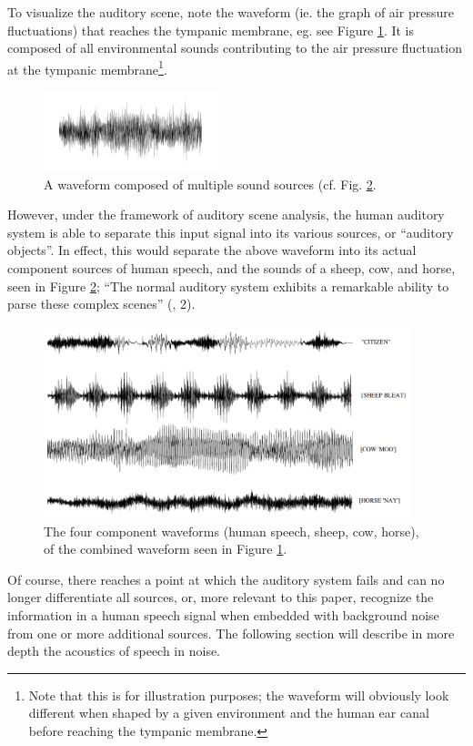 \documentclass[dissertation,copyright]{uathesis}
\begin{document}
To visualize the auditory scene, note the waveform (ie. the graph of air pressure fluctuations) that reaches the tympanic membrane, eg. see Figure \ref{fig:animal_singlechannel}.  It is composed of all environmental sounds contributing to the air pressure fluctuation at the tympanic membrane\footnote{Note that this is for illustration purposes; the waveform will obviously look different when shaped by a given environment and the human ear canal before reaching the tympanic membrane.}.
%
\begin{figure}
\centering
  \includegraphics[width=0.45\textwidth]{figure/single-channel-animals.png}
  \caption{A waveform composed of multiple sound sources (cf. Fig. \ref{fig:animal_multichannel}.}
  \label{fig:animal_singlechannel}
\end{figure}

However, under the framework of auditory scene analysis, the human auditory system is able to separate this input signal into its various sources, or ``auditory objects''.  In effect, this would separate the above waveform into its actual component sources of human speech, and the sounds of a sheep, cow, and horse, seen in Figure \ref{fig:animal_multichannel}; ``The normal auditory system exhibits a remarkable ability to parse these complex scenes'' (\cite{middlebrooks:17}, 2).
%
\begin{figure}
\centering
  \includegraphics[width=0.95\textwidth]{figure/multi-channel-animals_w-text.png}
  \caption{The four component waveforms (human speech, sheep, cow, horse), of the combined waveform seen in Figure \ref{fig:animal_singlechannel}.}
  \label{fig:animal_multichannel}
\end{figure}
%
Of course, there reaches a point at which the auditory system fails and can no longer differentiate all sources, or, more relevant to this paper, recognize the information in a human speech signal when embedded with background noise from one or more additional sources.  The following section will describe in more depth the acoustics of speech in noise.
  
\end{document}
